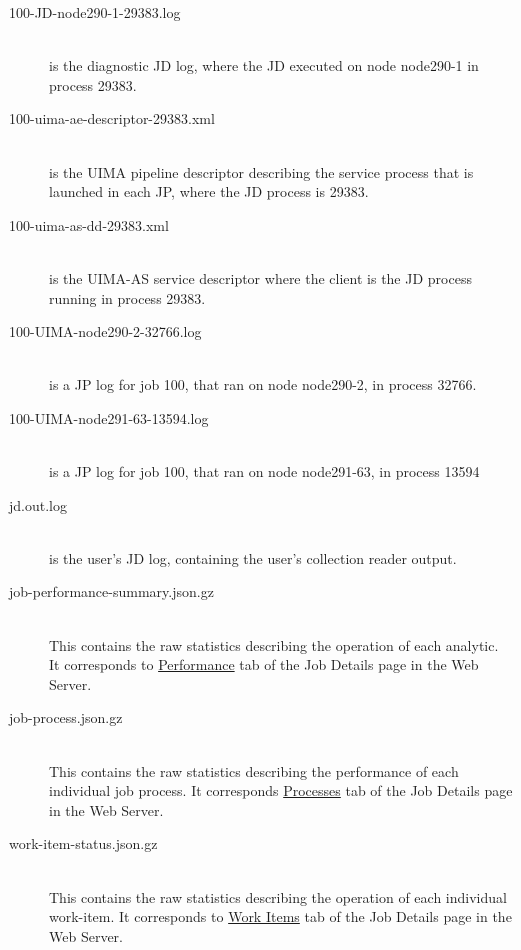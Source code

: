 \begin{description}
     \item[100-JD-node290-1-29383.log]  \hfill \\
       is the diagnostic JD log, where the JD executed on node
       node290-1 in process 29383.

     \item[100-uima-ae-descriptor-29383.xml]  \hfill \\
       is the UIMA pipeline descriptor describing the
       service process that is launched in each JP, where the JD process is 29383.

     \item[100-uima-as-dd-29383.xml]  \hfill \\
       is the UIMA-AS service descriptor where the client is
       the JD process running in process 29383.

     \item[100-UIMA-node290-2-32766.log]  \hfill \\
       is a JP log for job 100, that ran on node
       node290-2, in process 32766.

     \item[100-UIMA-node291-63-13594.log]  \hfill \\
       is a JP log for job 100, that ran on node
       node291-63, in process 13594

     \item[jd.out.log]  \hfill \\
       is the user's JD log, containing the user's collection reader output.

     \item[job-performance-summary.json.gz]  \hfill \\
       This contains the raw statistics describing
       the operation of each analytic.  It corresponds to \hyperref[subsec:performance]{Performance}
       tab of the Job Details page in the Web Server.

     \item[job-process.json.gz]  \hfill \\
       This contains the raw statistics describing
       the performance of each individual job process.  It corresponds \hyperref[subsec:ws-processes]{Processes}
       tab of the Job Details page in the Web Server.

     \item[work-item-status.json.gz]  \hfill \\
       This contains the raw statistics describing
       the operation of each individual work-item.  It corresponds to \hyperref[subsec:ws-work-items]{Work Items}
       tab of the Job Details page in the Web Server.
 \end{description}
     
